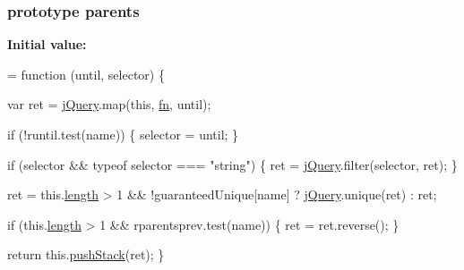 \subsubsection[{\texorpdfstring{parents}{parents}}]{ {\bf prototype} parents}\hypertarget{jquery-2_82_81-vsdoc_8js_a73895b5ab8d34f0181c620bc3a166cad}{}\label{jquery-2_82_81-vsdoc_8js_a73895b5ab8d34f0181c620bc3a166cad}
{\bfseries Initial value\+:}
\begin{DoxyCode}
= \textcolor{keyword}{function} (until, selector) \{
        

        var ret = \hyperlink{jquery-2_82_81-vsdoc_8js_add5237586d970a38a81f990e8eb28c6c}{jQuery}.map(\textcolor{keyword}{this}, \hyperlink{jquery-2_82_81-vsdoc_8js_acef6bdaf6b9b20fdcca1ea86f0902c3b}{fn}, until);

        \textcolor{keywordflow}{if} (!runtil.test(name)) \{
            selector = until;
        \}

        \textcolor{keywordflow}{if} (selector && typeof selector === \textcolor{stringliteral}{"string"}) \{
            ret = \hyperlink{jquery-2_82_81-vsdoc_8js_add5237586d970a38a81f990e8eb28c6c}{jQuery}.filter(selector, ret);
        \}

        ret = this.\hyperlink{jquery-2_82_81-vsdoc_8js_aa7de35d58da66d9944ab9cbe82c19640}{length} > 1 && !guaranteedUnique[name] ? \hyperlink{jquery-2_82_81-vsdoc_8js_add5237586d970a38a81f990e8eb28c6c}{jQuery}.unique(ret) : ret;

        \textcolor{keywordflow}{if} (this.\hyperlink{jquery-2_82_81-vsdoc_8js_aa7de35d58da66d9944ab9cbe82c19640}{length} > 1 && rparentsprev.test(name)) \{
            ret = ret.reverse();
        \}

        \textcolor{keywordflow}{return} this.\hyperlink{jquery-2_82_81-vsdoc_8js_afc3a7db1ef2b526338c06c07cecccd44}{pushStack}(ret);
    \}
\end{DoxyCode}

